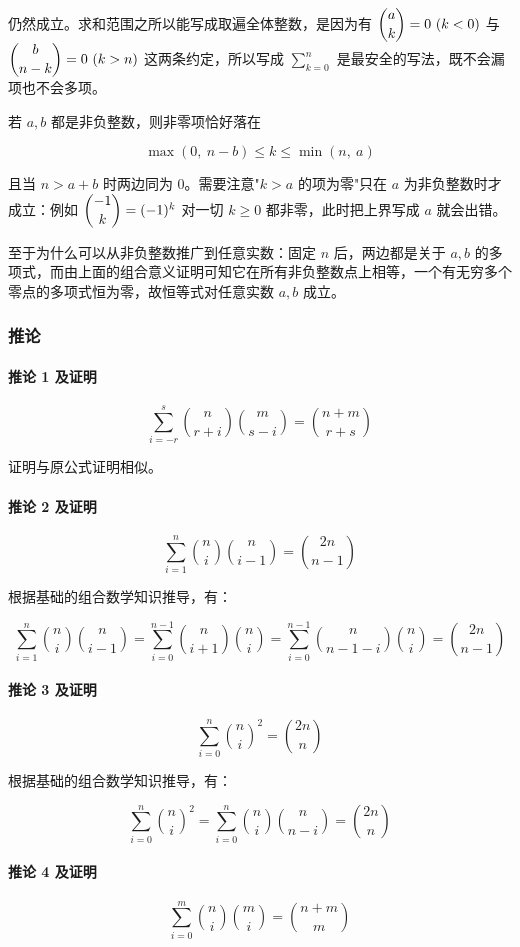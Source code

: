仍然成立。求和范围之所以能写成取遍全体整数，是因为有 $\dbinom{a}{k}=0\ (k<0)$ 与 $\dbinom{b}{n-k}=0\ (k>n)$ 这两条约定，所以写成 $\displaystyle\sum_{k=0}^{n}$ 是最安全的写法，既不会漏项也不会多项。

若 $a,b$ 都是非负整数，则非零项恰好落在

$$
\max(0,\ n-b)\le k\le\min(n,\ a)
$$

且当 $n>a+b$ 时两边同为 $0$。需要注意"$k>a$ 的项为零"只在 $a$ 为非负整数时才成立：例如 $\dbinom{-1}{k}=(-1)^k$ 对一切 $k\ge 0$ 都非零，此时把上界写成 $a$ 就会出错。

至于为什么可以从非负整数推广到任意实数：固定 $n$ 后，两边都是关于 $a,b$ 的多项式，而由上面的组合意义证明可知它在所有非负整数点上相等，一个有无穷多个零点的多项式恒为零，故恒等式对任意实数 $a,b$ 成立。

\hrulefill

\subsubsection*{推论}

\paragraph{推论 1 及证明}
$$
\sum_{i=-r}^{s}\binom{n}{r+i}\binom{m}{s-i}=\binom{n+m}{r+s}
$$

证明与原公式证明相似。

\paragraph{推论 2 及证明}
$$
\sum_{i=1}^n\binom{n}{i}\binom{n}{i-1}=\binom{2n}{n-1}
$$

根据基础的组合数学知识推导，有：

$$
\sum_{i=1}^n\binom{n}{i}\binom{n}{i-1}=\sum_{i=0}^{n-1}\binom{n}{i+1}\binom{n}{i}=\sum_{i=0}^{n-1}\binom{n}{n-1-i}\binom{n}{i}=\binom{2n}{n-1}
$$

\paragraph{推论 3 及证明}
$$
\sum_{i=0}^n\binom{n}{i}^2=\binom{2n}{n}
$$

根据基础的组合数学知识推导，有：

$$
\sum_{i=0}^n\binom{n}{i}^2=\sum_{i=0}^n\binom{n}{i}\binom{n}{n-i}=\binom{2n}{n}
$$

\paragraph{推论 4 及证明}
$$
\sum_{i=0}^m\binom{n}{i}\binom{m}{i}=\binom{n+m}{m}
$$


